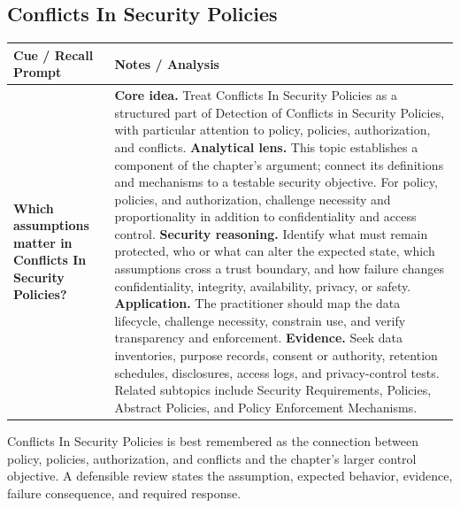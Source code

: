 \documentclass[11pt]{article}
\newcommand{\CornellHeader}{%
\rowcolor{Navy}\color{white}\bfseries Cue / Recall Prompt & \color{white}\bfseries Notes / Analysis\\\hline}
\newcommand{\CornellRow}[2]{%
\cellcolor{CueGray}\RaggedRight\textbf{#1} & \RaggedRight #2\\\hline}
\begin{document}
\subsection*{Conflicts In Security Policies}
\begin{longtable}{>{\RaggedRight\arraybackslash}p{}|>{\RaggedRight\arraybackslash}p{}}
\CornellHeader
\CornellRow{Which assumptions matter in Conflicts In Security Policies?}{\textbf{Core idea.} Treat Conflicts In Security Policies as a structured part of Detection of Conflicts in Security Policies, with particular attention to policy, policies, authorization, and conflicts. \textbf{Analytical lens.} This topic establishes a component of the chapter's argument; connect its definitions and mechanisms to a testable security objective. For policy, policies, and authorization, challenge necessity and proportionality in addition to confidentiality and access control. \textbf{Security reasoning.} Identify what must remain protected, who or what can alter the expected state, which assumptions cross a trust boundary, and how failure changes confidentiality, integrity, availability, privacy, or safety. \textbf{Application.} The practitioner should map the data lifecycle, challenge necessity, constrain use, and verify transparency and enforcement. \textbf{Evidence.} Seek data inventories, purpose records, consent or authority, retention schedules, disclosures, access logs, and privacy-control tests. Related subtopics include Security Requirements, Policies, Abstract Policies, and Policy Enforcement Mechanisms.}
\end{longtable}
\begin{topicsummary}
Conflicts In Security Policies is best remembered as the connection between policy, policies, authorization, and conflicts and the chapter's larger control objective. A defensible review states the assumption, expected behavior, evidence, failure consequence, and required response.
\end{topicsummary}
\end{document}
